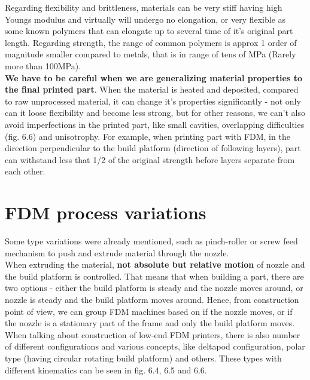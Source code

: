 \documentclass[a4paper, twoside, 11pt]{report}
\begin{document}
	Regarding flexibility and brittleness, materials can be very stiff having high Youngs modulus and virtually will undergo no elongation, or very flexible as some known polymers that can elongate up to several time of it's original part length. Regarding strength, the range of common polymers is approx 1 order of magnitude smaller compared to metals, that is in range of tens of MPa (Rarely more than 100MPa).
\\
\textbf{We have to be careful when we are generalizing material properties to the final printed part}. When the material is heated and deposited, compared to raw unprocessed material, it can change it's properties significantly - not only can it loose flexibility and become less strong, but for other reasons, we can't also avoid imperfections in the printed part, like small cavities, overlapping difficulties (fig. 6.6) and unisotrophy. For example, when printing part with FDM, in the direction perpendicular to the build platform (direction of following layers), part can withstand less that 1/2 of the original strength before layers separate from each other.

\section{FDM process variations}
Some type variations were already mentioned, such as pinch-roller or screw feed mechanism to push and extrude material through the nozzle.\\
	When extruding the material, \textbf{not absolute but relative motion} of nozzle and the build platform is controlled. That means that when building a part, there are two options - either the build platform is steady and the nozzle moves around, or nozzle is steady and the build platform moves around. Hence, from construction point of view, we can group FDM machines based on if the nozzle moves, or if the nozzle is a stationary part of the frame and only the build platform moves.\\
	When talking about construction of low-end FDM printers, there is also number of different configurations and various concepts, like deltapod configuration, polar type (having circular rotating build platform) and others. These types with different kinematics can be seen in fig. 6.4, 6.5 and 6.6.
\end{document}
